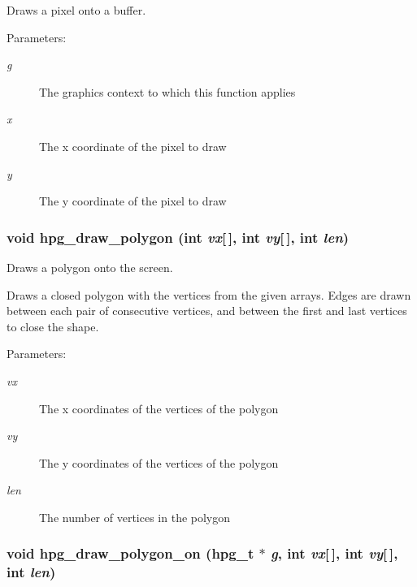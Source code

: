 Draws a pixel onto a buffer.

\begin{Desc}
\item[Parameters: ]\par
\begin{description}
\item[{\em 
g}]The graphics context to which this function applies \item[{\em 
x}]The x coordinate of the pixel to draw \item[{\em 
y}]The y coordinate of the pixel to draw \end{description}
\end{Desc}
\subsubsection{\setlength{\rightskip}{0pt plus 5cm}void hpg\_\-draw\_\-polygon (int {\em vx}[$\,$], int {\em vy}[$\,$], int {\em len})}\label{hpgraphics_8h_a53}


Draws a polygon onto the screen.

Draws a closed polygon with the vertices from the given arrays. Edges are drawn between each pair of consecutive vertices, and between the first and last vertices to close the shape.\begin{Desc}
\item[Parameters: ]\par
\begin{description}
\item[{\em 
vx}]The x coordinates of the vertices of the polygon \item[{\em 
vy}]The y coordinates of the vertices of the polygon \item[{\em 
len}]The number of vertices in the polygon \end{description}
\end{Desc}
\subsubsection{\setlength{\rightskip}{0pt plus 5cm}void hpg\_\-draw\_\-polygon\_\-on ({\bf hpg\_\-t} $\ast$ {\em g}, int {\em vx}[$\,$], int {\em vy}[$\,$], int {\em len})}\label{hpgraphics_8h_a52}


